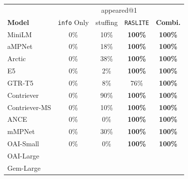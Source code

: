 \documentclass[a4paper, sigconf]{acmart}
\begin{document}
\begin{tabular}{l|cccc}
\hline
& \multicolumn{4}{c}{appeared@1} \\
\textbf{Model} & \texttt{info} Only & stuffing & \texttt{RASLITE} & \textbf{Combi.} \\ \hline
MiniLM & 0\% & 10\% & \textbf{100\%} & \textbf{100\%} \\ \hline
aMPNet & 0\% & 18\% & \textbf{100\%} & \textbf{100\%} \\ \hline
Arctic & 0\% & 38\% & \textbf{100\%} & \textbf{100\%} \\ \hline
E5 & 0\% & 2\% & \textbf{100\%} & \textbf{100\%} \\ \hline
GTR-T5 & 0\% & 8\% & 76\% & \textbf{100\%} \\ \hline
Contriever & 0\% & 90\% & \textbf{100\%} & \textbf{100\%} \\ \hline
Contriever-MS & 0\% & 10\% & \textbf{100\%} & \textbf{100\%} \\ \hline
ANCE & 0\% & 0\% & \textbf{100\%} & \textbf{100\%} \\ \hline
mMPNet & 0\% & 30\% & \textbf{100\%} & \textbf{100\%} \\ \hline
OAI-Small\footnotemark[1] & 0\% & 0\% & \textbf{100\%} & \textbf{100\%} \\ \hline
OAI-Large\footnotemark[1] & & & & \\ \hline
Gem-Large\footnotemark[1] & & & & \\ \hline
\end{tabular}
\end{document}
